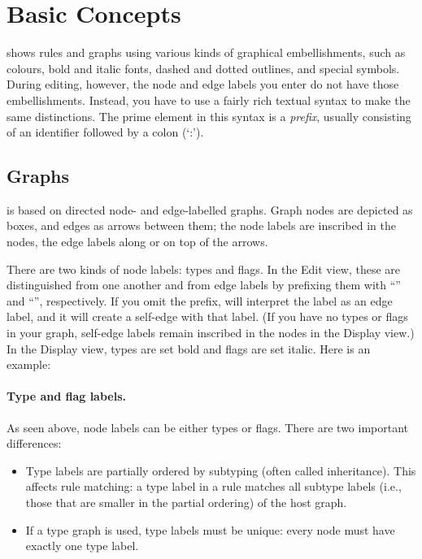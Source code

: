 \section{Basic Concepts}

\Groove shows rules and graphs using various kinds of graphical embellishments,
such as colours, bold and italic fonts, dashed and dotted outlines, and special
symbols. During editing, however, the node and edge labels you enter do not
have those embellishments. Instead, you have to use a fairly rich textual
syntax to make the same distinctions. The prime element in this syntax is a
\emph{prefix}, usually consisting of an identifier followed by a colon (`:').



\subsection{Graphs}

\Groove is based on directed node- and edge-labelled graphs. Graph nodes are
depicted as boxes, and edges as arrows between them; the node labels are
inscribed in the nodes, the edge labels along or on top of the arrows.

There are two kinds of node labels: types and flags. In the Edit view, these
are distinguished from one another and from edge labels by prefixing them with
``\typeP'' and ``\flagP'', respectively. If you omit the prefix, \Groove will
interpret the label as an edge label, and it will create a self-edge with that
label. (If you have no types or flags in your graph, self-edge labels remain
inscribed in the nodes in the Display view.) In the Display view, types are set
bold and flags are set italic. Here is an example:


\paragraph{Type and flag labels.}

As seen above, node labels can be either types or flags. There are two
important differences:
\begin{itemize}\noitemsep
\item Type labels are partially ordered by subtyping (often called
  inheritance). This affects rule matching: a type label in a rule matches all
  subtype labels (i.e., those that are smaller in the partial ordering) of the
  host graph.
\item If a type graph is used, type labels must be unique: every node must have
  exactly one type label.
\end{itemize}

